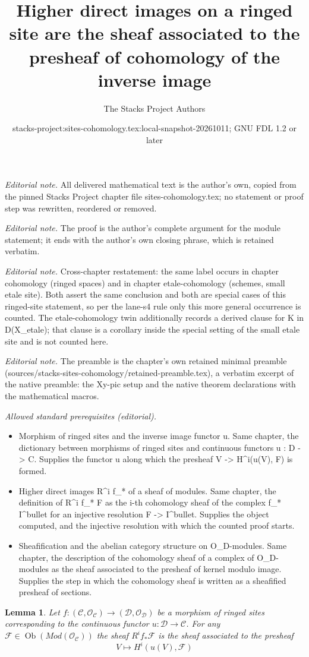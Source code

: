 \documentclass[10pt,a4paper]{amsart}
\title{Higher direct images on a ringed site are the sheaf associated to the presheaf of cohomology of the inverse image}
\author{The Stacks Project Authors}
\date{stacks-project:sites-cohomology.tex:local-snapshot-20261011; GNU FDL 1.2 or later}
\theoremstyle{plain}
\newtheorem{lemma}[subsection]{Lemma}
\theoremstyle{definition}
\theoremstyle{remark}
\numberwithin{equation}{subsection}
\def\Ob{\mathop{\mathrm{Ob}}\nolimits}
\begin{document}
\maketitle
\noindent\textit{Editorial note.} All delivered mathematical text is the author's own, copied from the pinned Stacks Project chapter file sites-cohomology.tex; no statement or proof step was rewritten, reordered or removed.\par\medskip
\noindent\textit{Editorial note.} The proof is the author's complete argument for the module statement; it ends with the author's own closing phrase, which is retained verbatim.\par\medskip
\noindent\textit{Editorial note.} Cross-chapter restatement: the same label occurs in chapter cohomology (ringed spaces) and in chapter etale-cohomology (schemes, small etale site). Both assert the same conclusion and both are special cases of this ringed-site statement, so per the lane-s4 rule only this more general occurrence is counted. The etale-cohomology twin additionally records a derived clause for K in D(X\_etale); that clause is a corollary inside the special setting of the small etale site and is not counted here.\par\medskip
\noindent\textit{Editorial note.} The preamble is the chapter's own retained minimal preamble (sources/stacks-sites-cohomology/retained-preamble.tex), a verbatim excerpt of the native preamble: the Xy-pic setup and the native theorem declarations with the mathematical macros.\par\medskip
\noindent\textit{Allowed standard prerequisites (editorial).}\begin{itemize}
\item Morphism of ringed sites and the inverse image functor u. Same chapter, the dictionary between morphisms of ringed sites and continuous functors u : D -> C. Supplies the functor u along which the presheaf V -> H\textasciicircum{}i(u(V), F) is formed.
\item Higher direct images R\textasciicircum{}i f\_* of a sheaf of modules. Same chapter, the definition of R\textasciicircum{}i f\_* F as the i-th cohomology sheaf of the complex f\_* I\textasciicircum{}bullet for an injective resolution F -> I\textasciicircum{}bullet. Supplies the object computed, and the injective resolution with which the counted proof starts.
\item Sheafification and the abelian category structure on O\_D-modules. Same chapter, the description of the cohomology sheaf of a complex of O\_D-modules as the sheaf associated to the presheaf of kernel modulo image. Supplies the step in which the cohomology sheaf is written as a sheafified presheaf of sections.
\end{itemize}\medskip
\begin{lemma}
\label{lemma-higher-direct-images}
Let $f : (\mathcal{C}, \mathcal{O}_\mathcal{C}) \to
(\mathcal{D}, \mathcal{O}_\mathcal{D})$ be a morphism of ringed sites
corresponding to the continuous functor $u : \mathcal{D} \to \mathcal{C}$.
For any $\mathcal{F} \in \Ob(\textit{Mod}(\mathcal{O}_\mathcal{C}))$
the sheaf $R^if_*\mathcal{F}$ is the sheaf associated to the
presheaf
$$
V \longmapsto H^i(u(V), \mathcal{F})
$$
\end{lemma}
\end{document}
